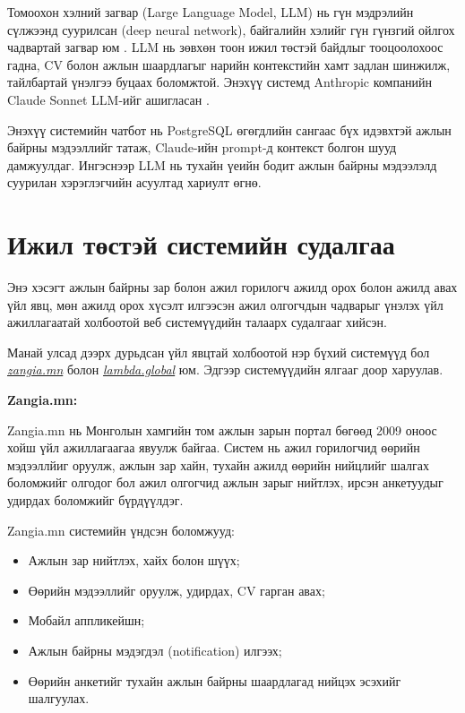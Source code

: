 \par{}Томоохон хэлний загвар (Large Language Model, LLM) нь гүн мэдрэлийн сүлжээнд суурилсан (deep neural network), байгалийн хэлийг гүн гүнзгий ойлгох чадвартай загвар юм \cite{brown2020gpt3}. LLM нь зөвхөн тоон ижил төстэй байдлыг тооцоолохоос гадна, CV болон ажлын шаардлагыг нарийн контекстийн хамт задлан шинжилж, тайлбартай үнэлгээ буцаах боломжтой. Энэхүү системд Anthropic компанийн Claude Sonnet LLM-ийг ашигласан \cite{anthropic2024claude}.

\par{}Энэхүү системийн чатбот нь PostgreSQL өгөгдлийн сангаас бүх идэвхтэй ажлын байрны мэдээллийг татаж, Claude-ийн prompt-д контекст болгон шууд дамжуулдаг. Ингэснээр LLM нь тухайн үеийн бодит ажлын байрны мэдээлэлд суурилан хэрэглэгчийн асуултад хариулт өгнө.

\section{Ижил төстэй системийн судалгаа}
\par{}Энэ хэсэгт ажлын байрны зар болон ажил горилогч ажилд орох болон ажилд авах үйл явц, мөн ажилд орох хүсэлт илгээсэн ажил олгогчдын чадварыг үнэлэх үйл ажиллагаатай холбоотой веб системүүдийн талаарх судалгааг хийсэн.
\par{} Манай улсад дээрх дурьдсан үйл явцтай холбоотой нэр бүхий системүүд бол \href{https://www.zangia.mn}{\textit{zangia.mn}} болон \href{https://lambda.global}{\textit{lambda.global}} юм. Эдгээр системүүдийн ялгааг доор харуулав.

\par{} \textbf{Zangia.mn:}
\par{}Zangia.mn нь Монголын хамгийн том ажлын зарын портал бөгөөд 2009 оноос хойш үйл ажиллагаагаа явуулж байгаа. Систем нь ажил горилогчид өөрийн мэдээллйиг оруулж, ажлын зар хайн, тухайн ажилд өөрийн нийцлийг шалгах боломжийг олгодог бол ажил олгогчид ажлын зарыг нийтлэх, ирсэн анкетуудыг удирдах боломжийг бүрдүүлдэг.

\par{}Zangia.mn системийн үндсэн боломжууд:
\begin{itemize}
    \item Ажлын зар нийтлэх, хайх болон шүүх;
    \item Өөрийн мэдээллийг оруулж, удирдах, CV гарган авах;
    \item Мобайл аппликейшн;
    \item Ажлын байрны мэдэгдэл (notification) илгээх;
    \item Өөрийн анкетийг тухайн ажлын байрны шаардлагад нийцэх эсэхийг шалгуулах.
\end{itemize}

